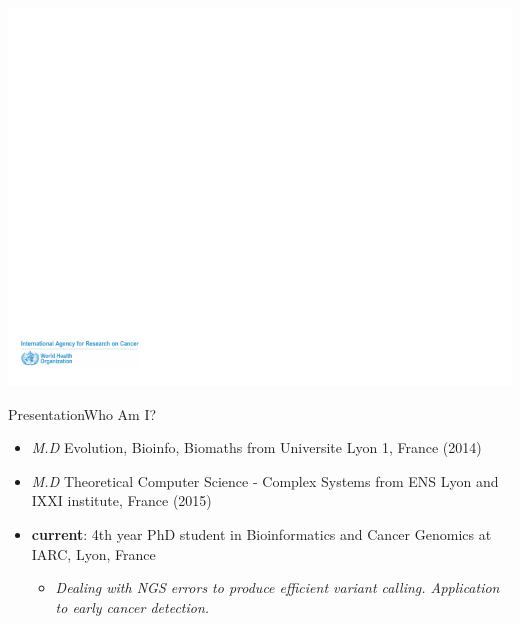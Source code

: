 \documentclass[xcolor=table,compress]{beamer} %
\begin{document}
\usebackgroundtemplate%
{%
    \includegraphics[width=\paperwidth,height=\paperheight]{pictures/back_all_slides.pdf}%
}
\small
\begin{frame}{Presentation}{Who Am I?}
\begin{itemize}
	\item \textit{M.D} Evolution, Bioinfo, Biomaths from Universite Lyon 1, France (2014)
	\item \textit{M.D} Theoretical Computer Science - Complex Systems from ENS Lyon and IXXI institute, France (2015)
	\item \textbf{current}: 4th year PhD student in Bioinformatics and Cancer Genomics at IARC, Lyon, France
	\begin{itemize}
		\item \textit{Dealing with NGS errors to produce efficient variant calling. Application to early cancer detection.}
	\end{itemize}
\end{itemize}
\end{frame}
\end{document}
